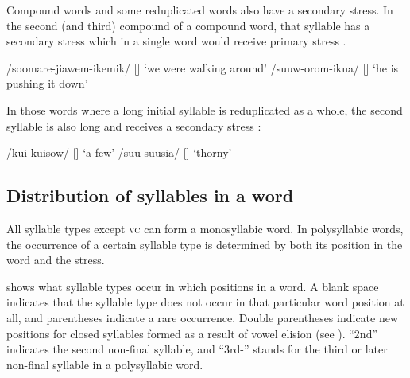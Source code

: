 Compound words and some reduplicated words also have a secondary stress.  In the second (and third) compound of a compound word, that syllable has a secondary stress which in a single word would receive primary stress . 

\ea
\label{ex:2:stressfour}
\ea
/soomare-jiawem-ikemik/  []  `we were walking around'
\ex
/suuw-orom-ikua/  []  `he is pushing it down'
\z
\z

In those words where a long initial syllable is reduplicated as a whole, the second syllable is also long and receives a secondary stress :

\ea
\label{ex:2:stressfive}
\ea
/kui-kuisow/  []  `a few'
\ex
/suu-suusia/  []  `thorny'
\z
\z

\subsection{Distribution of syllables in a word}\label{sec:2.3.2}

All syllable types except  \textsc{vc} can form a monosyllabic word. In polysyllabic words, the occurrence of a certain syllable type is determined by both its position in the word and the stress. 

 shows what syllable types occur in which positions in a word.  A blank space indicates that the syllable type does not occur in that particular word position at all, and parentheses indicate a rare occurrence. Double parentheses indicate new positions for closed syllables formed as a result of vowel elision (see ). ``2nd'' indicates the second non-final syllable, and ``3rd-'' stands for the third or later non-final syllable in a polysyllabic word.


